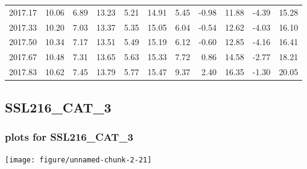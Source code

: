 \documentclass[10pt,a4paper]{article}\usepackage[]{graphicx}\usepackage[]{color}
\makeatletter
\def\maxwidth{ %
  \ifdim\Gin@nat@width>\linewidth
    \linewidth
  \else
    \Gin@nat@width
  \fi
}
\newcommand{\AaA}{\_}
\makeatother
\begin{document}
\begin{table}[ht]
\begin{tabular}{rrrrrrrrrrr}
  2017.17 & 10.06 & 6.89 & 13.23 & 5.21 & 14.91 & 5.45 & -0.98 & 11.88 & -4.39 & 15.28 \\ 
  2017.33 & 10.20 & 7.03 & 13.37 & 5.35 & 15.05 & 6.04 & -0.54 & 12.62 & -4.03 & 16.10 \\ 
  2017.50 & 10.34 & 7.17 & 13.51 & 5.49 & 15.19 & 6.12 & -0.60 & 12.85 & -4.16 & 16.41 \\ 
  2017.67 & 10.48 & 7.31 & 13.65 & 5.63 & 15.33 & 7.72 & 0.86 & 14.58 & -2.77 & 18.21 \\ 
  2017.83 & 10.62 & 7.45 & 13.79 & 5.77 & 15.47 & 9.37 & 2.40 & 16.35 & -1.30 & 20.05 \\ 
   \hline
\end{tabular}
\end{table}

\newpage
\subsection{SSL216\AaA CAT\AaA 3}
\subsubsection{plots for SSL216\AaA CAT\AaA 3}

\texttt{[image: figure/unnamed-chunk-2-21]} 

\newpage
\end{document}
